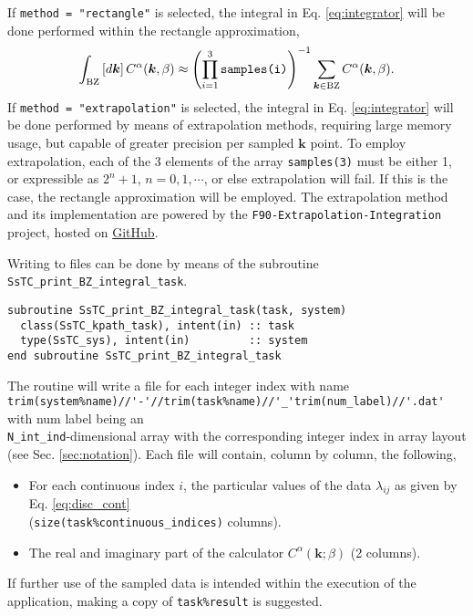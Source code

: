 \documentclass[10pt,a4paper]{article}
\begin{document}
If \verb|method = "rectangle"| is selected, the integral in Eq. \eqref{eq:integrator} will be done performed within the rectangle approximation,
\begin{equation}
\int_{\text{BZ}} \left[d\bm{k}\right]C^{\alpha}(\bm{k},\beta) \approx \left(\prod_{i=1}^3 \verb|samples(i)|\right)^{-1}\sum_{\bm{k}\in\text{BZ}} C^{\alpha}(\bm{k},\beta).
\end{equation}
If \verb|method = "extrapolation"| is selected, the integral in Eq. \eqref{eq:integrator} will be done performed by means of extrapolation methods, requiring large memory usage, but capable of greater precision per sampled $\bm{k}$ point. To employ extrapolation, each of the 3 elements of the array \verb|samples(3)| must be either 1, or expressible as $2^n + 1$, $n = 0, 1, \cdots$, or else extrapolation will fail. If this is the case, the rectangle approximation will be employed. The extrapolation method and its implementation are powered by the \verb|F90-Extrapolation-Integration| project, hosted on \href{https://github.com/irukoa/F90-Extrapolation-Integration}{GitHub}.

Writing to files can be done by means of the subroutine \verb|SsTC_print_BZ_integral_task|.
\begin{lstlisting}[caption={Interface of the ``integrator" printer.},captionpos=b]
subroutine SsTC_print_BZ_integral_task(task, system)
  class(SsTC_kpath_task), intent(in) :: task
  type(SsTC_sys), intent(in)         :: system
end subroutine SsTC_print_BZ_integral_task
\end{lstlisting}
The routine will write a file for each integer index with name \\ \verb|trim(system%name)//'-'//trim(task%name)//'_'trim(num_label)//'.dat'| with num label being an \\ \verb|N_int_ind|-dimensional array with the corresponding integer index in array layout (see Sec. \ref{sec:notation}). Each file will contain, column by column, the following,
\begin{itemize}
\item For each continuous index $i$, the particular values of the data $\lambda_{ij}$ as given by Eq. \eqref{eq:disc_cont} \\ (\verb|size(task%continuous_indices)| columns).
\item The real and imaginary part of the calculator $C^{\alpha}(\bm{k};\beta)$ (2 columns).
\end{itemize}
If further use of the sampled data is intended within the execution of the application, making a copy of \verb|task%result| is suggested.
\end{document}
